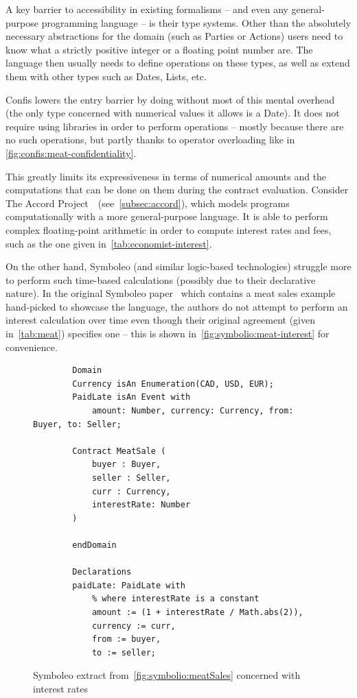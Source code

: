 A key barrier to accessibility in existing formalisms -- and even any general-purpose programming language -- is their type systems.
Other than the absolutely necessary abstractions for the domain (such as Parties or Actions) users need to know what a strictly positive integer or a floating point number are.
The language then usually needs to define operations on these types, as well as extend them with other types such as Dates, Lists, etc.

Confis lowers the entry barrier by doing without most of this mental overhead (the only type concerned with numerical values it allows is a Date).
It does not require using libraries in order to perform operations -- mostly because there are no such operations, but partly thanks to operator overloading like in \autoref{fig:confis:meat-confidentiality}.

This greatly limits its expressiveness in terms of numerical amounts and the computations that can be done on them during the contract evaluation.
Consider The Accord Project~\cite{accordHomepage}~(see~\autoref{subsec:accord}), which models programs computationally with a more general-purpose language.
It is able to perform complex floating-point arithmetic in order to compute interest rates and fees, such as the one given in~\autoref{tab:economist-interest}.

On the other hand, Symboleo (and similar logic-based technologies) struggle more to perform such time-based calculations (possibly due to their declarative nature).
In the original Symboleo paper~\cite{symboleo2020} which contains a meat sales example hand-picked to showcase the language, the authors do not attempt to perform an interest calculation over time even though their original agreement (given in~\autoref{tab:meat}) specifies one -- this is shown in~\autoref{fig:symbolio:meat-interest} for convenience.

\begin{figure}[h]
    \centering
    \begin{minipage}{0.85\textwidth}
        \begin{verbatim}
        Domain
        Currency isAn Enumeration(CAD, USD, EUR);
        PaidLate isAn Event with
            amount: Number, currency: Currency, from: Buyer, to: Seller;

        Contract MeatSale (
            buyer : Buyer,
            seller : Seller,
            curr : Currency,
            interestRate: Number
        )

        endDomain

        Declarations
        paidLate: PaidLate with
            % where interestRate is a constant
            amount := (1 + interestRate / Math.abs(2)),
            currency := curr,
            from := buyer,
            to := seller;
        \end{verbatim}
    \end{minipage}
    \caption{Symboleo extract from~\autoref{fig:symbolio:meatSales} concerned with interest rates}
    \label{fig:symbolio:meat-interest}
\end{figure}

